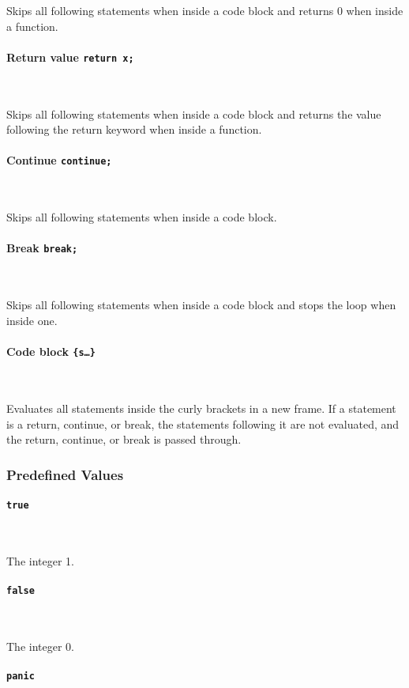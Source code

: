 Skips all following statements when inside a code block and returns 0 when inside a function.

\paragraph{Return value \quad \texttt{return x;}} \

Skips all following statements when inside a code block and returns the value following the return keyword when inside a function.

\paragraph{Continue \quad \texttt{continue;}} \

Skips all following statements when inside a code block.

\paragraph{Break \quad \texttt{break;}} \

Skips all following statements when inside a code block and stops the loop when inside one.

\paragraph{Code block \quad \texttt{\{s\ldots\}}} \

Evaluates all statements inside the curly brackets in a new frame. If a statement is a return, continue, or break, the statements following it are not evaluated, and the return, continue, or break is passed through.

\subsubsection{Predefined Values}

\paragraph{\texttt{true}} \

The integer 1.

\paragraph{\texttt{false}} \

The integer 0.

\paragraph{\texttt{panic}} \

